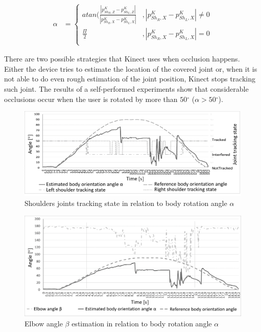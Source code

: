 \documentclass[sensors,article,submit,moreauthors,pdftex,10pt,a4paper]{mdpi}
\newcommand{\degree}{\ensuremath{{}^{\circ}}\xspace}
\begin{document}
\begin{equation}
	\label{eq:kinect:bodyRotationAngle}
	\begin{split}
		\alpha &= 
		\begin{cases} 
			atan(\frac{|p^K_{{Sh}_R,Z} - p^K_{{Sh}_L,Z}|}{|p^K_{{Sh}_R,X} - p^K_{{Sh}_L,X}|} & , |p^K_{{Sh}_R,X} - p^K_{{Sh}_L,X}| \neq 0 \\
			\frac{\Pi}{2}                                                                    & , |p^K_{{Sh}_R,X} - p^K_{{Sh}_L,X}| = 0    \\		
		\end{cases}
	\end{split}
\end{equation}

There are two possible strategies that Kinect uses when occlusion happens. Either the device tries to estimate the location of the covered joint or, when it is not able to do even rough estimation of the joint position, Kinect stops tracking such joint. The results of a self-performed experiments show that considerable occlusions occur when the user is rotated by more than $50\degree$ ($\alpha > 50\degree$). 

\begin{figure}[H]
	\centering
	\includegraphics[width=12cm]{Figure4.png}
	\caption{Shoulders joints tracking state in relation to body rotation angle $\alpha$}
	\label{fig:kinect:trackingVsAlpha}
\end{figure}

\begin{figure}[H]
	\centering
	\includegraphics[width=12cm]{Figure5.png}
	\caption{Elbow angle $\beta$ estimation in relation to body rotation angle $\alpha$}
	\label{fig:kinect:betaVsAlpha}
\end{figure}
\end{document}
